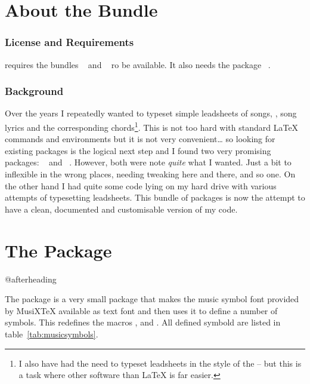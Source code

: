 \documentclass[load-preamble+]{cnltx-doc}
\begin{document}
\part{About the Bundle}

\section{License and Requirements}

\license

\leadsheets{} requires the bundles ~\cite{bnd:l3kernel} and
~\cite{bnd:l3packages} ro be available.  It also needs the
package ~\cite{pkg:translations}.

\section{Background}

Over the years I repeatedly wanted to typeset simple leadsheets of songs, \ie,
song lyrics and the corresponding chords\footnote{I also have had the need to
  typeset leadsheets in the style of the  -- but this
  is a task where other software than \LaTeX{} is far easier.}.  This is not
too hard with standard \LaTeX{} commands and environments but it is not very
convenient\ldots{} so looking for existing packages is the logical next step
and I found two very promising packages: ~\cite{pkg:songs} and
~\cite{pkg:songbook}.  However, both were note \emph{quite} what
I wanted.  Just a bit to inflexible in the wrong places, needing tweaking here
and there, and so one.  On the other hand I had quite some code lying on my
hard drive with various attempts of typesetting leadsheets.  This bundle of
packages is now the attempt to have a clean, documented and customisable
version of my code.


\part{The \musicsymbols{} Package}
\vspace*{\baselineskip}\csname @afterheading\endcsname

The \musicsymbols{} package is a very small package that makes the music
symbol font provided by MusiX\TeX{} available as text font and then uses it to
define a number of symbols.  This redefines the macros , 
and .  All defined symbold are listed in
table~\ref{tab:musicsymbols}.
\end{document}
